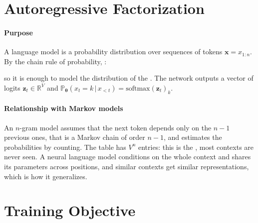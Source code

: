 \section{Autoregressive Factorization}
\paragraph{Purpose}
A language model is a probability distribution over sequences of tokens
$\bm{x}=x_{1:n}$. By the chain rule of probability, :
\begin{center}
\end{center}
so it is enough to model the distribution of the .
The network outputs a vector of logits $\bm{z}_{t}\in\mathbb{R}^{V}$ and
$\mathbb{P}_{\bm{\theta}}\left(x_{t}=k\,|\,x_{<t}\right)=\mathrm{softmax}(\bm{z}_{t})_{k}$.

\paragraph{Relationship with Markov models}
An $n$-gram model assumes that the next token depends only on the $n-1$ previous ones, that is
a Markov chain of order $n-1$, and estimates the probabilities by counting. The table has
$V^{n}$ entries: this is the , most contexts are never seen.
A neural language model conditions on the whole context and shares its parameters across
positions, and similar contexts get similar representations, which is how it generalizes.

\section{Training Objective}
